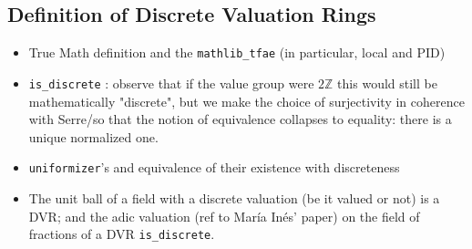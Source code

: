 \documentclass[sigplan,10pt,anonymous,review]{acmart}\settopmatter{printfolios=true,printccs=false,printacmref=false}
\newcommand*{\ZZ}{\mathbb{Z}}
\begin{document}
\subsection{Definition of Discrete Valuation Rings}
\begin{itemize}
	\item True Math definition and the \texttt{mathlib\_tfae} (in particular, local and PID)
	\item \texttt{is\_discrete} : observe that if the value group were $2\ZZ$ this would still be mathematically "discrete", but we make the choice of surjectivity in coherence with Serre/so that the notion of equivalence collapses to equality: there is a unique normalized one.
	\item \texttt{uniformizer}'s and equivalence of their existence with discreteness
	\item The unit ball of a field with a discrete valuation (be it valued or not) is a DVR; and the adic valuation (ref to María Inés' paper) on the field of fractions of a DVR \texttt{is\_discrete}.
\end{itemize}
\end{document}
